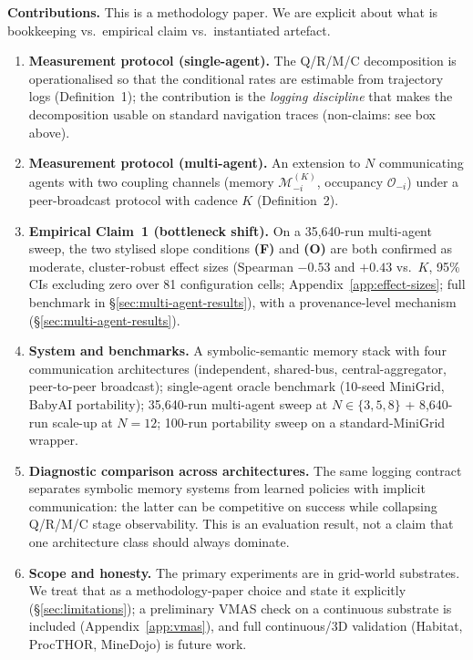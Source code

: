 \documentclass{article}
\begin{document}
\textbf{Contributions.} This is a methodology paper. We are explicit about what is bookkeeping vs.\ empirical claim vs.\ instantiated artefact.
\begin{enumerate}[leftmargin=20pt,itemsep=2pt,topsep=2pt]
\item \textbf{Measurement protocol (single-agent).} The Q/R/M/C decomposition is operationalised so that the conditional rates are estimable from trajectory logs (Definition~1); the contribution is the \emph{logging discipline} that makes the decomposition usable on standard navigation traces (non-claims: see box above).

\item \textbf{Measurement protocol (multi-agent).} An extension to $N$ communicating agents with two coupling channels (memory $\mathcal{M}_{-i}^{(K)}$, occupancy $\mathcal{O}_{-i}$) under a peer-broadcast protocol with cadence $K$ (Definition~2).

\item \textbf{Empirical Claim~1 (bottleneck shift).} On a 35{,}640-run multi-agent sweep, the two stylised slope conditions \textbf{(F)} and \textbf{(O)} are both confirmed as moderate, cluster-robust effect sizes (Spearman $-0.53$ and $+0.43$ vs.\ $K$, 95\% CIs excluding zero over 81 configuration cells; Appendix~\ref{app:effect-sizes}; full benchmark in \S\ref{sec:multi-agent-results}), with a provenance-level mechanism (\S\ref{sec:multi-agent-results}).

\item \textbf{System and benchmarks.} A symbolic-semantic memory stack with four communication architectures (independent, shared-bus, central-aggregator, peer-to-peer broadcast); single-agent oracle benchmark (10-seed MiniGrid, BabyAI portability); 35{,}640-run multi-agent sweep at $N\!\in\!\{3,5,8\}$ + 8{,}640-run scale-up at $N\!=\!12$; 100-run portability sweep on a standard-MiniGrid wrapper.

\item \textbf{Diagnostic comparison across architectures.} The same logging contract separates symbolic memory systems from learned policies with implicit communication: the latter can be competitive on success while collapsing Q/R/M/C stage observability. This is an evaluation result, not a claim that one architecture class should always dominate.

\item \textbf{Scope and honesty.} The primary experiments are in grid-world substrates. We treat that as a methodology-paper choice and state it explicitly (\S\ref{sec:limitations}); a preliminary VMAS check on a continuous substrate is included (Appendix~\ref{app:vmas}), and full continuous/3D validation (Habitat, ProcTHOR, MineDojo) is future work.
\end{enumerate}
\end{document}
